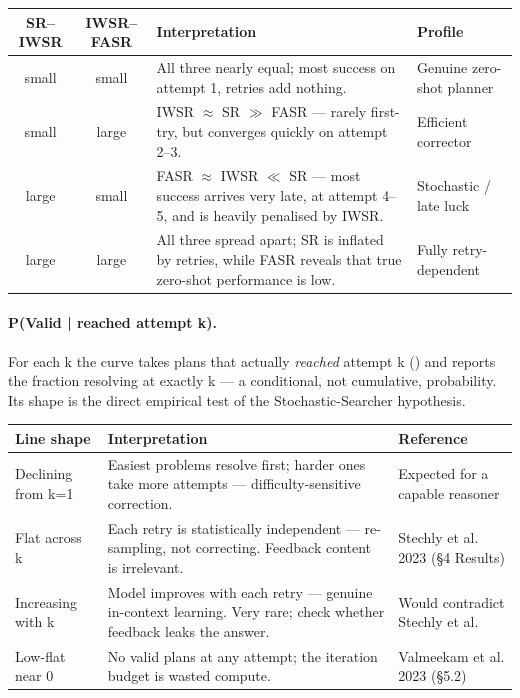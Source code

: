 \begin{table}[h]\small
\centering
\setlength{\tabcolsep}{4pt}
\begin{tabularx}{\linewidth}{@{}C C I P@{}}
\toprule
SR--IWSR & IWSR--FASR & Interpretation & Profile\\
\midrule
small & small & All three nearly equal; most success on attempt 1, retries add nothing. & Genuine zero-shot planner\\
\addlinespace
small & large & IWSR \(\approx\) SR \(\gg\) FASR --- rarely first-try, but converges quickly on attempt 2--3. & Efficient corrector\\
\addlinespace
large & small & FASR \(\approx\) IWSR \(\ll\) SR --- most success arrives very late, at attempt 4--5, and is heavily penalised by IWSR. & Stochastic / late luck\\
\addlinespace
large & large & All three spread apart; SR is inflated by retries, while FASR reveals that true zero-shot performance is low. & Fully retry-dependent\\
\bottomrule
\end{tabularx}
\end{table}

\paragraph{P(Valid | reached attempt k).}

For each k the curve takes plans that actually \emph{reached} attempt k () and reports the fraction resolving at exactly k --- a conditional, not cumulative, probability. Its shape is the direct empirical test of the Stochastic-Searcher hypothesis.

\begin{table}[h]\small
\centering
\begin{tabularx}{\linewidth}{@{}Y I P@{}}
\toprule
Line shape & Interpretation & Reference\\
\midrule
Declining from k=1 & Easiest problems resolve first; harder ones take more attempts --- difficulty-sensitive correction. & Expected for a capable reasoner\\
\addlinespace
Flat across k & Each retry is statistically independent --- re-sampling, not correcting. Feedback content is irrelevant. & Stechly et al. 2023 (\S{}4 Results)\\
\addlinespace
Increasing with k & Model improves with each retry --- genuine in-context learning. Very rare; check whether feedback leaks the answer. & Would contradict Stechly et al.\\
\addlinespace
Low-flat near 0 & No valid plans at any attempt; the iteration budget is wasted compute. & Valmeekam et al. 2023 (\S{}5.2)\\
\bottomrule
\end{tabularx}
\end{table}

